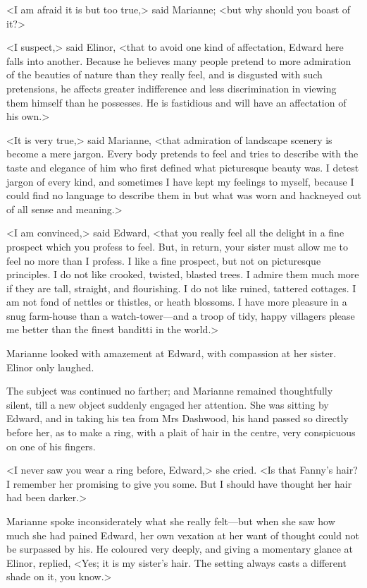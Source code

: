 <I am afraid it is but too true,> said Marianne; <but why should you boast of it?>

<I suspect,> said Elinor, <that to avoid one kind of affectation, Edward here falls into another. Because he believes many people pretend to more admiration of the beauties of nature than they really feel, and is disgusted with such pretensions, he affects greater indifference and less discrimination in viewing them himself than he possesses. He is fastidious and will have an affectation of his own.>

<It is very true,> said Marianne, <that admiration of landscape scenery is become a mere jargon. Every body pretends to feel and tries to describe with the taste and elegance of him who first defined what picturesque beauty was. I detest jargon of every kind, and sometimes I have kept my feelings to myself, because I could find no language to describe them in but what was worn and hackneyed out of all sense and meaning.>

<I am convinced,> said Edward, <that you really feel all the delight in a fine prospect which you profess to feel. But, in return, your sister must allow me to feel no more than I profess. I like a fine prospect, but not on picturesque principles. I do not like crooked, twisted, blasted trees. I admire them much more if they are tall, straight, and flourishing. I do not like ruined, tattered cottages. I am not fond of nettles or thistles, or heath blossoms. I have more pleasure in a snug farm-house than a watch-tower—and a troop of tidy, happy villagers please me better than the finest banditti in the world.>

Marianne looked with amazement at Edward, with compassion at her sister. Elinor only laughed.

The subject was continued no farther; and Marianne remained thoughtfully silent, till a new object suddenly engaged her attention. She was sitting by Edward, and in taking his tea from Mrs Dashwood, his hand passed so directly before her, as to make a ring, with a plait of hair in the centre, very conspicuous on one of his fingers.

<I never saw you wear a ring before, Edward,> she cried. <Is that Fanny's hair? I remember her promising to give you some. But I should have thought her hair had been darker.>

Marianne spoke inconsiderately what she really felt—but when she saw how much she had pained Edward, her own vexation at her want of thought could not be surpassed by his. He coloured very deeply, and giving a momentary glance at Elinor, replied, <Yes; it is my sister's hair. The setting always casts a different shade on it, you know.>

